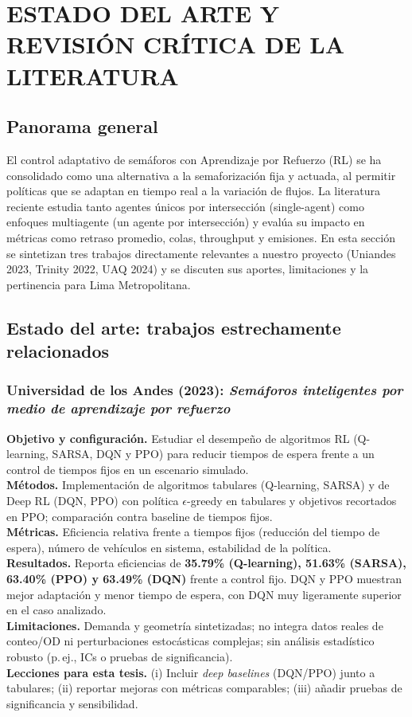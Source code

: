\chapter{ESTADO DEL ARTE Y REVISIÓN CRÍTICA DE LA LITERATURA}

\section{Panorama general}
El control adaptativo de semáforos con Aprendizaje por Refuerzo (RL) se ha consolidado como una alternativa a la semaforización fija y actuada, al permitir políticas que se adaptan en tiempo real a la variación de flujos. La literatura reciente estudia tanto agentes únicos por intersección (single-agent) como enfoques multiagente (un agente por intersección) y evalúa su impacto en métricas como retraso promedio, colas, throughput y emisiones. En esta sección se sintetizan tres trabajos directamente relevantes a nuestro proyecto (Uniandes 2023, Trinity 2022, UAQ 2024) y se discuten sus aportes, limitaciones y la pertinencia para Lima Metropolitana.

\section{Estado del arte: trabajos estrechamente relacionados}

\subsection*{Universidad de los Andes (2023): \textit{Semáforos inteligentes por medio de aprendizaje por refuerzo} \citep{Chavez2023}}
\textbf{Objetivo y configuración.} Estudiar el desempeño de algoritmos RL (Q-learning, SARSA, DQN y PPO) para reducir tiempos de espera frente a un control de tiempos fijos en un escenario simulado. \\
\textbf{Métodos.} Implementación de algoritmos tabulares (Q-learning, SARSA) y de Deep RL (DQN, PPO) con política $\epsilon$-greedy en tabulares y objetivos recortados en PPO; comparación contra baseline de tiempos fijos. \\
\textbf{Métricas.} Eficiencia relativa frente a tiempos fijos (reducción del tiempo de espera), número de vehículos en sistema, estabilidad de la política. \\
\textbf{Resultados.} Reporta eficiencias de \textbf{35.79\% (Q-learning), 51.63\% (SARSA), 63.40\% (PPO) y 63.49\% (DQN)} frente a control fijo. DQN y PPO muestran mejor adaptación y menor tiempo de espera, con DQN muy ligeramente superior en el caso analizado. \\
\textbf{Limitaciones.} Demanda y geometría sintetizadas; no integra datos reales de conteo/OD ni perturbaciones estocásticas complejas; sin análisis estadístico robusto (p.\,ej., ICs o pruebas de significancia). \\
\textbf{Lecciones para esta tesis.} (i) Incluir \textit{deep baselines} (DQN/PPO) junto a tabulares; (ii) reportar mejoras con métricas comparables; (iii) añadir pruebas de significancia y sensibilidad.

